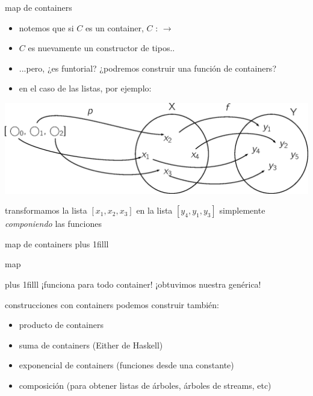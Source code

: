 \documentclass[9pt]{beamer}
\newcommand{\saltar}{\vspace{1ex}}
\newcommand{\llenar}{\vskip0pt plus 1filll}
\begin{document}
\begin{frame}{map de containers}
  \begin{itemize}
  \item notemos que si $C$ es un container, \AgdaFunction{$\llbracket$} $C$ \AgdaFunction{$\rrbracket$} :  $\to$ 
  \item \AgdaFunction{$\llbracket$} $C$ \AgdaFunction{$\rrbracket$} es nuevamente un constructor de tipos..
  \item ...pero, ¿es funtorial? ¿podremos construir una función  de containers?
    \pause
  \item en el caso de las listas, por ejemplo:
  \end{itemize} 
  \includegraphics[scale=0.4]{img/map.eps}\\\saltar
  
  transformamos la lista $[x_1,x_2,x_3]$ en la lista $[y_4,y_1,y_3]$ simplemente \emph{componiendo} las funciones
\end{frame}

\begin{frame}{map de containers}
  \llenar
  \begin{exampleblock}{map}
  \end{exampleblock}
  \llenar
  \pause
  ¡funciona para todo container! ¡obtuvimos nuestra  genérica!
\end{frame}

\begin{frame}{construcciones con containers}
  podemos construir también:
  \begin{itemize}
    \item producto de containers
    \item suma de containers (Either de Haskell)
    \item exponencial de containers (funciones desde una constante) 
    \item composición (para obtener listas de árboles, árboles de streams, etc)
  \end{itemize}
\end{frame}
\end{document}
